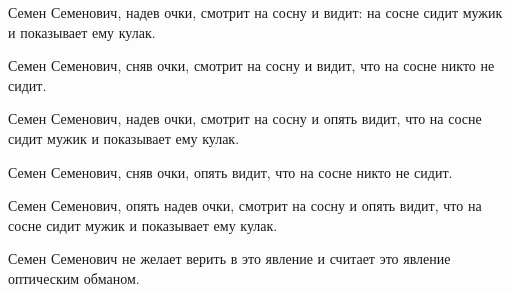 Семен Семенович, надев очки, смотрит на сосну и видит: на сосне сидит мужик и показывает ему кулак.

Семен Семенович, сняв очки, смотрит на сосну и видит, что на сосне никто не сидит.

Семен Семенович, надев очки, смотрит на сосну и опять видит, что на сосне сидит мужик и показывает ему кулак.

Семен Семенович, сняв очки, опять видит, что на сосне никто не сидит.

Семен Семенович, опять надев очки, смотрит на сосну и опять видит, что на сосне сидит мужик и показывает ему кулак.

Семен Семенович не желает верить в это явление и считает это явление оптическим обманом.